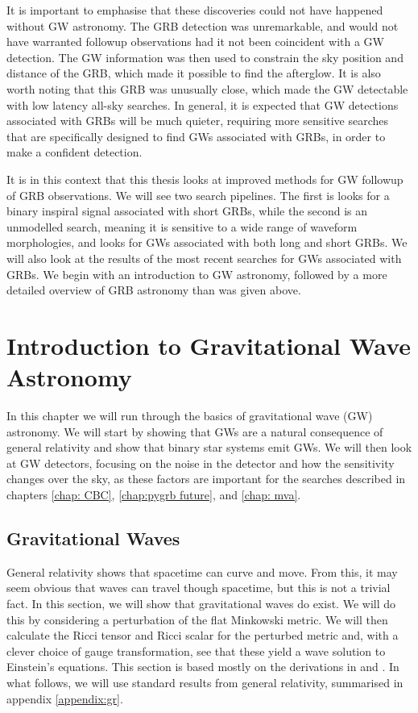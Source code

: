 \documentclass[11pt]{cuthesis}
\begin{document}
It is important to emphasise that these discoveries could not have happened without GW astronomy. The GRB detection was unremarkable, and would not have warranted followup observations had it not been coincident with a GW detection. The GW information was then used to constrain the sky position and distance of the GRB, which made it possible to find the afterglow. It is also worth noting that this GRB was unusually close, which made the GW detectable with low latency all-sky searches. In general, it is expected that GW detections associated with GRBs will be much quieter, requiring more sensitive searches that are specifically designed to find GWs associated with GRBs, in order to make a confident detection.

It is in this context that this thesis looks at improved methods for GW followup of GRB observations. We will see two search pipelines. The first is looks for a binary inspiral signal associated with short GRBs, while the second is an unmodelled search, meaning it is sensitive to a wide range of waveform morphologies, and looks for GWs associated with both long and short GRBs. We will also look at the results of the most recent searches for GWs associated with GRBs. We begin with an introduction to GW astronomy, followed by a more detailed overview of GRB astronomy than was given above. 


\chapter{Introduction to Gravitational Wave Astronomy} \label{chap: gw bg}
In this chapter we will run through the basics of gravitational wave (GW) astronomy. We will start by showing that GWs are a natural consequence of general relativity and show that binary star systems emit GWs. We will then look at GW detectors, focusing on the noise in the detector and how the sensitivity changes over the sky, as these factors are important for the searches described in chapters \ref{chap: CBC}, \ref{chap:pygrb future}, and \ref{chap: mva}.


\section{Gravitational Waves}
General relativity shows that spacetime can curve and move. From this, it may seem obvious that waves can travel though spacetime, but this is not a trivial fact. In this section, we will show that gravitational waves do exist. We will do this by considering a perturbation of the flat Minkowski metric. We will then calculate the Ricci tensor and Ricci scalar for the perturbed metric and, with a clever choice of gauge transformation, see that these yield a wave solution to Einstein's equations. This section is based mostly on the derivations in \cite{zee-einstein} and \cite{carroll-spacetime}. In what follows, we will use standard results from general relativity, summarised in appendix \ref{appendix:gr}.
\end{document}
